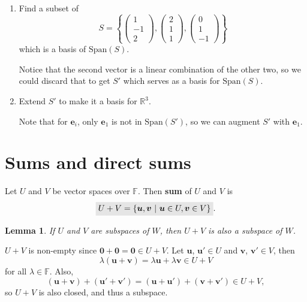 \documentclass[letter-paper]{tufte-book}
\newtheorem{lemma}[theorem]{\color{pastel-blue}Lemma}
\newenvironment{proof}[1][Proof]{\begin{trivlist}
\item[\hskip \labelsep {\bfseries #1}]}{\end{trivlist}}
\newenvironment{example}[1][Example]{\begin{trivlist}
\item[\hskip \labelsep {\bfseries #1}]}{\end{trivlist}}
\newcommand{\eb}{{\boldsymbol{e}}}
\newcommand{\ub}{{\boldsymbol{u}}}
\newcommand{\vb}{{\boldsymbol{v}}}
\newcommand{\highlight}[1]{\mathchoice%
  {\colorbox{black!10}{$\displaystyle#1$}}%
  {\colorbox{black!10}{$\textstyle#1$}}%
  {\colorbox{black!10}{$\scriptstyle#1$}}%
  {\colorbox{black!10}{$\scriptscriptstyle#1$}}}%
\begin{document}
\begin{example}
  \begin{enumerate}
    \item Find a subset of
    \begin{equation*}
      S = \left\{\begin{pmatrix}1 \\ -1\\ 2\end{pmatrix}, \begin{pmatrix}2 \\ 1\\ 1\end{pmatrix}, \begin{pmatrix}0 \\ 1\\ -1\end{pmatrix}\right\}
    \end{equation*}
    which is a basis of $\mbox{Span}(S)$.
    
    Notice that the second vector is a linear combination of the other two, so
    we could discard that to get $S'$ which serves as a basis for
    $\mbox{Span}(S)$.
    
    \item Extend $S'$ to make it a basis for $\mathbb{R}^3$.
    
    Note that for $\eb_i$, only $\eb_1$ is not in $\mbox{Span}(S')$, so we can
    augment $S'$ with $\eb_1$.
  \end{enumerate}
\end{example}


\section{Sums and direct sums}

Let $U$ and $V$ be vector spaces over $\mathbb{F}$. Then \textbf{sum} of $U$ and
$V$ is
\begin{equation}
  \highlight{U + V = \{\ub, \vb\ |\ \ub \in U, \vb \in V \}}.
\end{equation}

\begin{lemma}
  If $U$ and $V$ are subspaces of $W$, then $U+V$ is also a subspace of $W$.
\end{lemma}

\begin{proof}
  $U+V$ is non-empty since $\boldsymbol{0} + \boldsymbol{0} = \boldsymbol{0} \in
  U+V$. Let $\ub$, $\ub' \in U$ and $\vb$, $\vb' \in V$, then
  \begin{equation*}
    \lambda(\ub + \vb) = \lambda\ub + \lambda\vb \in U+V
  \end{equation*}
  for all $\lambda \in \mathbb{F}$. Also,
  \begin{equation*}
    (\ub+\vb) + (\ub'+\vb') = (\ub + \ub') + (\vb + \vb') \in U+V,
  \end{equation*}
  so $U+V$ is also closed, and thus a subspace.
\end{proof}
\end{document}
